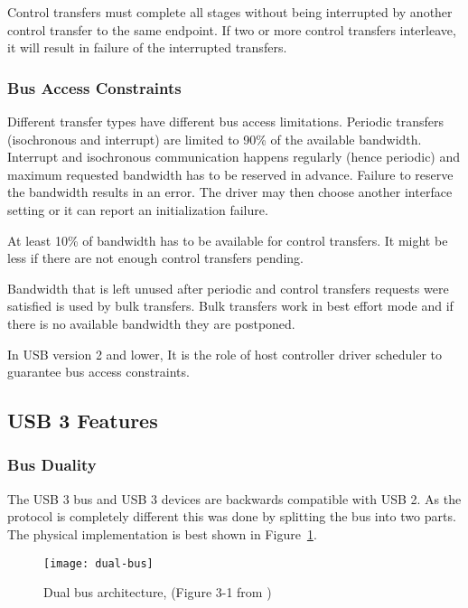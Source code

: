Control transfers must complete all stages without being interrupted by another
control transfer to the same endpoint. If two or more control transfers
interleave, it will result in failure of the interrupted transfers.

\subsubsection{Bus Access Constraints}

Different transfer types have different bus access limitations. Periodic
transfers (isochronous and interrupt) are limited to 90\% of the available
bandwidth. Interrupt and isochronous communication happens regularly (hence
periodic) and maximum requested bandwidth has to be reserved in advance.
Failure to reserve the bandwidth results in an error. The driver may then
choose another interface setting or it can report an initialization failure.

At least 10\% of bandwidth has to be available for control transfers. It might
be less if there are not enough control transfers pending.

Bandwidth that is left unused after periodic and control transfers requests
were satisfied is used by bulk transfers. Bulk transfers work in best effort
mode and if there is no available bandwidth they are postponed.

In USB version 2 and lower, It is the role of host controller driver scheduler
to guarantee bus access constraints.

\subsection{USB 3 Features}

\subsubsection{Bus Duality}
\label{sec:dual-bus}

The USB 3 bus and USB 3 devices are backwards compatible with USB 2. As the
protocol is completely different this was done by splitting the bus into two
parts. The physical implementation is best shown in Figure~\ref{fig:dual-bus}.

\begin{figure}[h]
	\centering
	\texttt{[image: dual-bus]}
	\caption{Dual bus architecture, (Figure 3-1 from \cite{usb3})}
	\label{fig:dual-bus}
\end{figure}

